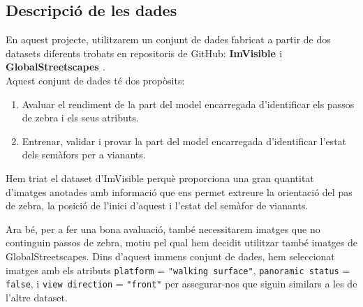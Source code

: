\documentclass[10pt,a4paper,twocolumn,twoside]{article}
\begin{document}
\subsection{Descripció de les dades}
En aquest projecte, utilitzarem un conjunt de dades fabricat a partir de dos datasets diferents trobats en repositoris de GitHub: \textbf{ImVisible \cite{ImVisible}} i \textbf{GlobalStreetscapes \cite{GlobalStreetscapes}}.
\vspace*{0.3em}
\\
Aquest conjunt de dades té dos propòsits:
\vspace*{-0.3em}
\begin{enumerate}
	\item Avaluar el rendiment de la part del model encarregada d'identificar els passos de zebra i els seus atributs.
	\item Entrenar, validar i provar la part del model encarregada d'identificar l'estat dels semàfors per a vianants.
\end{enumerate}
Hem triat el dataset d'ImVisible perquè proporciona una gran quantitat d'imatges anotades amb informació que ens permet extreure la orientació del pas de zebra, la posició de l'inici d'aquest i l'estat del semàfor de vianants.

Ara bé, per a fer una bona avaluació, també necessitarem imatges que no continguin passos de zebra, motiu pel qual hem decidit utilitzar també imatges de GlobalStreetscapes. Dins d'aquest immens conjunt de dades, hem seleccionat imatges amb els atributs \texttt{platform} = \texttt{"walking surface"}, \texttt{panoramic status} = \texttt{false}, i \texttt{view direction} = \texttt{"front"}
 per assegurar-nos que siguin similars a les de l'altre dataset.
\end{document}
